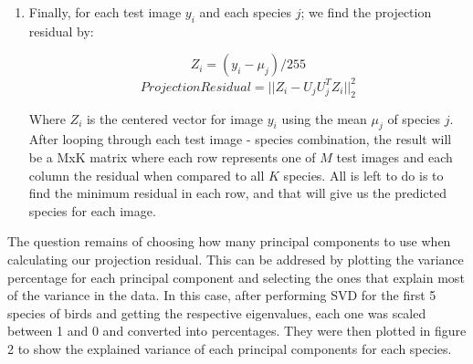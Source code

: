 \documentclass[11pt]{article}
\begin{document}
\begin{singlespace}
\begin{enumerate}
\item Finally, for each test image $y_i$ and each species $j$; we find the projection residual by:

$$ Z_i = (y_i - \mu_j )/255$$
$$ Projection Residual = || Z_i - U_jU_j^TZ_i ||^2_2 $$

Where $Z_i$ is the centered vector for image $y_i$ using the mean $\mu_j$ of species $j$. After looping through each test image - species combination, the result will be a MxK matrix where each row represents one of $M$ test images and each column the residual when compared to all $K$ species. All is left to do is to find the minimum residual in each row, and that will give us the predicted species for each image. 
\end{enumerate}

The question remains of choosing how many principal components to use when calculating our projection residual. This can be addresed by plotting the variance percentage for each principal component and selecting the ones that explain most of the variance in the data. In this case, after performing SVD for the first 5 species of birds and getting the respective eigenvalues, each one was scaled between 1 and 0 and converted into percentages. They were then plotted in figure 2 to show the explained variance of each principal components for each species. \\

\begin{figure}[h]
    \centering
    

\end{figure}
\end{singlespace}
\end{document}
